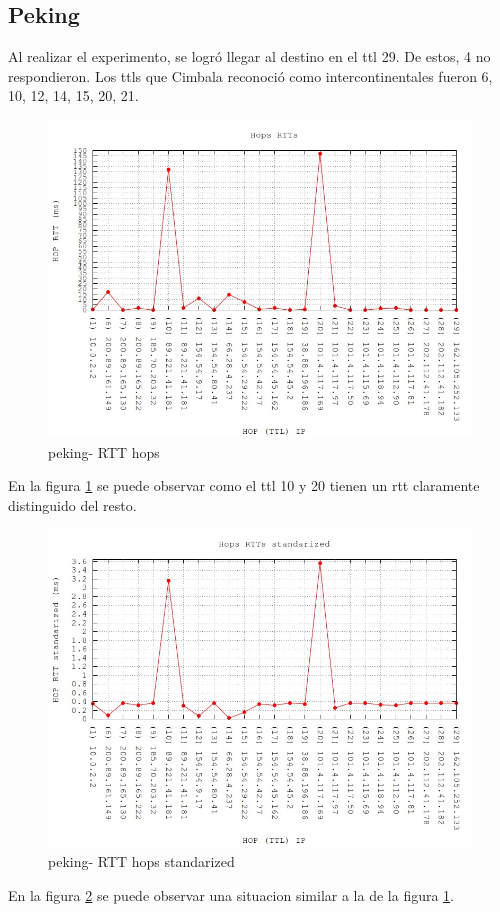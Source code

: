 \subsection{Peking}

Al realizar el experimento, se logró llegar al destino en el ttl 29. De estos, 4 no respondieron. Los ttls que Cimbala reconoció como intercontinentales fueron 6, 10, 12, 14, 15, 20, 21.

\begin{figure}[h!]
  \centering
    \includegraphics[scale=0.6]{imagenes/peking-graficos/traceroute-peking.jpg}
  \caption{peking- RTT hops}
  \label{fig:10}
\end{figure}

En la figura \ref{fig:10} se puede observar como el ttl 10 y 20 tienen un rtt claramente distinguido del resto.

\begin{figure}[h!]
  \centering
    \includegraphics[scale=0.6]{imagenes/peking-graficos/traceroute-peking-standarized.jpg}
  \caption{peking- RTT hops standarized}
  \label{fig:11}
\end{figure}

En la figura \ref{fig:11} se puede observar una situacion similar a la de la figura \ref{fig:10}.

